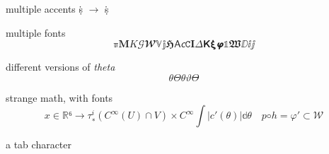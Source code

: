 \documentclass[a4paper,english]{article}
\begin{document}
multiple accents ṩ \(→\)  \.{\d{s}}

multiple fonts
\[ ℼ 𝐌 𝐾 𝒢 𝓦 𝕍 𝕛 𝕳 𝖠 𝘤 𝙲 𝚰 𝛥 𝝟 𝝽 𝞿 𝟙 𝖂 ⅅ ⅈ ⅉ\]



different versions of \emph{theta}
\[\theta Θ  θ  ϑ  ϴ \]

strange math, with fonts
\[𝑥 ∈ ℝ⁶→  τ_∗^ i (C ^ ∞ (U ) ∩ V) × 𝐶^ ∞  ∫ |𝑐' (𝜃)| 𝕕𝜃 \quad 𝑝◦ℎ = 𝜑' ⊂ 𝒲\]

a	tab character
\end{document}

